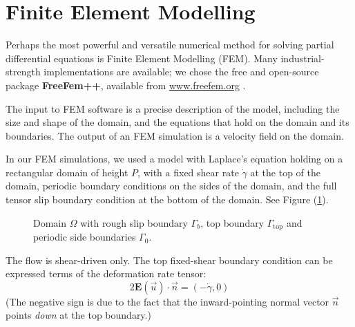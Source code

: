 \documentclass[12pt, a4paper, twoside, openright]{book}
\begin{document}
\section{Finite Element Modelling}

Perhaps the most powerful and versatile numerical method for solving partial differential equations is Finite Element Modelling (FEM).  Many industrial-strength implementations are available; we chose the free and open-source package \textbf{FreeFem++}, available from \url{www.freefem.org} \cite{freefem++}.

The input to FEM software is a precise description of the model, including the size and shape of the domain, and the equations that hold on the domain and its boundaries. The output of an FEM simulation is a velocity field on the domain.  

In our FEM simulations, we used a model with Laplace's equation holding on a rectangular domain of height $P$, with a fixed shear rate $\dot{\gamma} $ at the top of the domain, periodic boundary conditions on the sides of the domain, and the full tensor slip boundary condition at the bottom of the domain.  See Figure (\ref{FEMdomain}).

\begin{figure}[ht]
\centering
{}
\caption{Domain $\Omega$ with rough slip boundary $ \Gamma_b $, top boundary $\Gamma_{\mathrm{top}}$ and periodic side boundaries $\Gamma_0$.}\label{FEMdomain}
\end{figure}

The flow is shear-driven only.  The top fixed-shear boundary condition can be expressed terms of the deformation rate tensor:
\begin{equation}
 2 \mathbf{E}(\vec{u}) \cdot \vec{n} = (- \dot{\gamma}, 0)
\end{equation}
(The negative sign is due to the fact that the inward-pointing normal vector $\vec{n}$ points \emph{down} at the top boundary.)
\end{document}
